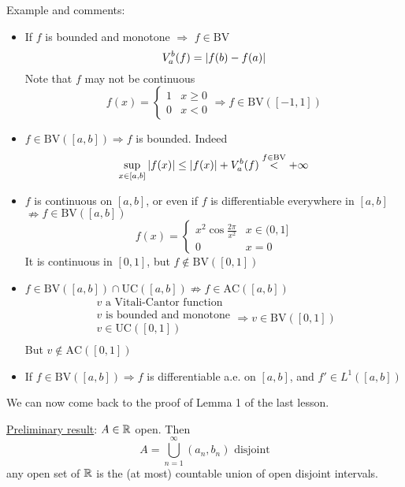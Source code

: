 Example and comments:
\begin{itemize}
    \item If \(f\) is bounded and monotone \(\Rightarrow\) \(f \in \mbox{BV}\)
    \[
        V_a^b (f) = \abs{f(b) - f(a)}
    \]
    Note that \(f\) may not be continuous
    \[
        f(x) = \begin{cases}
            1 & x \geq 0 \\
            0 & x < 0
        \end{cases}
        \Rightarrow f \in \mbox{BV}([-1,1])
    \]
    \item \(f \in \mbox{BV}([a,b]) \Rightarrow f\) is bounded. Indeed
    \[
        \sup_{x \in [a,b]} \abs{f(x)} \leq \abs{f(x)} + V_a^b(f) \overset{f \in \text{BV}}{<} +\infty
    \]
    \item \(f\) is continuous on \([a,b]\), or even if  \(f\) is differentiable everywhere in \([a,b]\) \(\nRightarrow f \in \mbox{BV}([a,b])\)
    \[
        f(x) = \begin{cases}
            x^2\cos{\frac{2\pi}{x^2}} & x \in (0,1] \\
            0 & x = 0
        \end{cases}
    \]
    It is continuous in \([0,1]\), but \(f \notin \mbox{BV}([0,1])\)
    \item \(f \in \mbox{BV}([a,b]) \cap \mbox{UC}([a,b])  \nRightarrow f \in \mbox{AC}([a,b])\)
    \[\begin{array}{l}
        v \mbox{ a Vitali-Cantor function} \\ v \mbox{ is bounded and monotone} \\ 
        v \in \mbox{UC}([0,1]) \\ 
        
    \end{array}
    \Rightarrow v \in \mbox{BV}([0,1]) 
    \]
    But \(v \not \in \mbox{AC}([0,1])\)
    \item If \(f \in \mbox{BV}([a,b]) \Rightarrow f\) is differentiable a.e. on \([a,b]\), and \(f' \in L^1([a,b])\)
\end{itemize}
We can now come back to the proof of Lemma 1 of the last lesson.

\noindent\underline{Preliminary result}: \(A \in \mathbb{R}\) open. Then 
\[
    A = \bigcup_{n=1}^{\infty}(a_n, b_n) \mbox{ disjoint}
\]
    any open set of \(\mathbb{R}\) is the (at most) countable union of open disjoint intervals.

